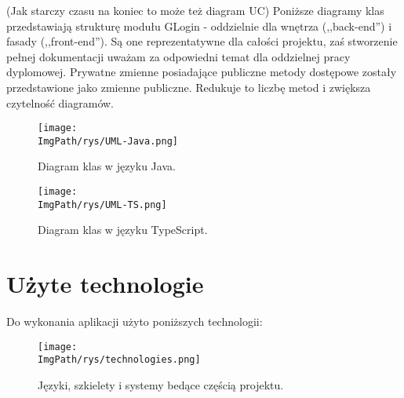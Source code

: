 \documentclass[a4paper,12pt,twoside,openany]{report}
\newcommand{\ImgPath}{.}
\begin{document}
	(Jak starczy czasu na koniec to może też diagram UC)
	Poniższe diagramy klas przedstawiają strukturę modułu GLogin - oddzielnie dla wnętrza (,,back-end'') i fasady (,,front-end''). Są one reprezentatywne dla całości projektu, zaś stworzenie pełnej dokumentacji uważam za odpowiedni temat dla oddzielnej pracy dyplomowej. Prywatne zmienne posiadające publiczne metody dostępowe zostały przedstawione jako zmienne publiczne. Redukuje to liczbę metod i zwiększa czytelność diagramów.
	\begin{figure}[!htbp]
		\begin{center}
			\centering
			\texttt{[image: \\ImgPath/rys/UML-Java.png]}
		\end{center}
		\caption{Diagram klas w języku Java.}
		\label{UMLJava}
	\end{figure}
		\begin{figure}[!htbp]
			\begin{center}
				\centering
				\texttt{[image: \\ImgPath/rys/UML-TS.png]}
			\end{center}
			\caption{Diagram klas w języku TypeScript.}
			\label{UMLTS}
		\end{figure}
\section{Użyte technologie}
Do wykonania aplikacji użyto poniższych technologii: 
	\begin{figure}[!htbp]
		\begin{center}
			\centering
			\texttt{[image: \\ImgPath/rys/technologies.png]}
		\end{center}
		\caption{Języki, szkielety i systemy bedące częścią projektu.}
		\label{technologies}
	\end{figure}	
\end{document}
